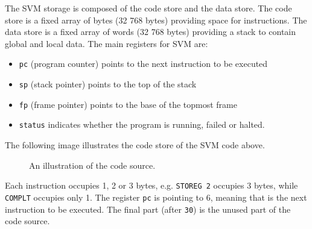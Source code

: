 \documentclass[a4paper, openany]{memoir}
\begin{document}
The SVM storage is composed of the code store and the data store. The code store is a fixed array of bytes (32 768 bytes) providing space for instructions. The data store is a fixed array of words (32 768 bytes) providing a stack to contain global and local data. The main registers for SVM are:
\begin{itemize}
    \item \texttt{pc} (program counter) points to the next instruction to be executed
    \item \texttt{sp} (stack pointer) points to the top of the stack
    \item \texttt{fp} (frame pointer) points to the base of the topmost frame
    \item \texttt{status} indicates whether the program is running, failed or halted.
\end{itemize}

The following image illustrates the code store of the SVM code above.
\begin{figure}[H]
    \centering
    \caption{An illustration of the code source.}
\end{figure}
\noindent Each instruction occupies 1, 2 or 3 bytes, e.g. \texttt{STOREG 2} occupies 3 bytes, while \texttt{COMPLT} occupies only 1. The register \texttt{pc} is pointing to 6, meaning that is the next instruction to be executed. The final part (after \texttt{30}) is the unused part of the code source.
\end{document}
